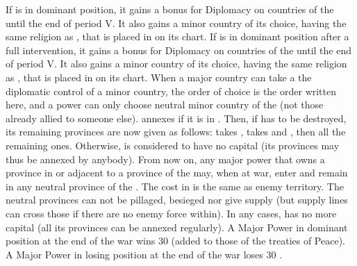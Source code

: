 \begin{digressions}
  \aparag[England] If \ENG is in dominant position, it gains a 
  bonus for Diplomacy on countries of the \HRE until the end of period V.  It
  also gains a minor country of its choice, having the same religion as \ENG,
  that is placed in \EG on its chart.
  \aparag[Poland] If \POL is in dominant position after a full intervention,
  it gains a  bonus for Diplomacy on countries of the \HRE until the
  end of period V.  It also gains a minor country of its choice, having the
  same religion as \POL, that is placed in \EG on its chart.
  \aparag When a major country can take a the diplomatic control of a minor
  country, the order of choice is the order written here, and a power can only
  choose neutral minor country of the \HRE (not those already allied to
  someone else).
  \aparag \paysBrandebourg annexes  if it is in
  \paysHanse.
  \aparag Then, if \paysHanse has to be destroyed, its remaining provinces are
  now given as follows: \SUE takes \provinceBremen, \paysBrandebourg takes
   and \provinceMecklenburg, then \DANmin all the
  remaining ones.
  \bparag Otherwise, \paysHanse is considered to have no capital (its
  provinces may thus be annexed by anybody).
  \aparag From now on, any major power that owns a province in \HRE or
  adjacent to a province of the \HRE may, when at war, enter and remain in any
  neutral province of the \HRE. The cost in \MP is the same as enemy
  territory. The neutral provinces can not be pillaged, besieged nor give
  supply (but supply lines can cross those if there are no enemy force
  within).
  \aparag In any cases, \paysHanse has no more capital (all its provinces can
  be annexed regularly).
  \bparag A Major Power in dominant position at the end of the war wins 30 \PV
  (added to those of the treaties of Peace).
  \bparag A Major Power in losing position at the end of the war loses 30 \PV.
\end{digressions}

